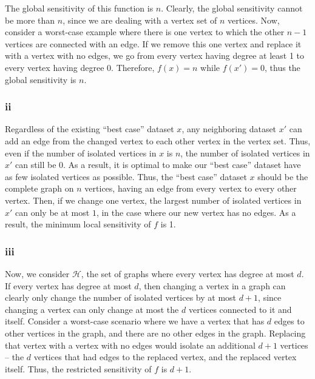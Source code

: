 \documentclass[12pt]{article}
\begin{document}
The global sensitivity of this function is $n$. Clearly, the global sensitivity cannot be more than $n$, since we are dealing with a vertex set of $n$ vertices. Now, consider a worst-case example where there is one vertex to which the other $n-1$ vertices are connected with an edge. If we remove this one vertex and replace it with a vertex with no edges, we go from every vertex having degree at least 1 to every vertex having degree 0. Therefore, $f(x) = n$ while $f(x') = 0$, thus the global sensitivity is $n$.

\subsubsection{ii}

\noindent

Regardless of the existing ``best case'' dataset $x$, any neighboring dataset $x'$ can add an edge from the changed vertex to each other vertex in the vertex set. Thus, even if the number of isolated vertices in $x$ is $n$, the number of isolated vertices in $x'$ can still be $0$. As a result, it is optimal to make our ``best case'' dataset have as few isolated vertices as possible. Thus, the ``best case'' dataset $x$ should be the complete graph on $n$ vertices, having an edge from every vertex to every other vertex. Then, if we change one vertex, the largest number of isolated vertices in $x'$ can only be at most $1$, in the case where our new vertex has no edges. As a result, the minimum local sensitivity of $f$ is 1.

\subsubsection{iii}

\noindent

Now, we consider $\mathcal{H}$, the set of graphs where every vertex has degree at most $d$. If every vertex has degree at most $d$, then changing a vertex in a graph can clearly only change the number of isolated vertices by at most $d+1$, since changing a vertex can only change at most the $d$ vertices connected to it and itself. Consider a worst-case scenario where we have a vertex that has $d$ edges to other vertices in the graph, and there are no other edges in the graph. Replacing that vertex with a vertex with no edges would isolate an additional $d+1$ vertices -- the $d$ vertices that had edges to the replaced vertex, and the replaced vertex itself. Thus, the restricted sensitivity of $f$ is $d+1$.
\end{document}
